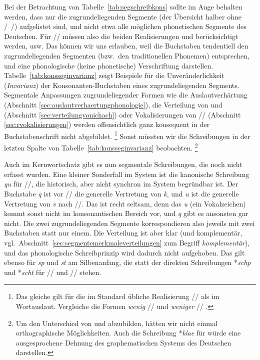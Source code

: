 Bei der Betrachtung von Tabelle~\ref{tab:segschreibkons} sollte im Auge behalten werden, dass nur die zugrundeliegenden Segmente (der Übersicht halber ohne /~/) aufgelistet sind, und nicht etwa alle möglichen phonetischen Segmente des Deutschen.
Für // müssen also die beiden Realisierungen \textipa{[\c{c}]} und \textipa{[X]} berücksichtigt werden, usw.
Das können wir uns erlauben, weil die Buchstaben tendentiell den zugrundeliegenden Segmenten (bzw.\ den traditionellen Phonemen) entsprechen, und eine phonologische (keine phonetische) Verschriftung darstellen.
Tabelle~\ref{tab:konsseginvarianz} zeigt Beispiele für die Unveränderlichkeit (\textit{Invarianz}) der Konsonanten-Buchstaben eines zugrundeliegenden Segments.
Segmentale Anpassungen zugrundeliegender Formen wie die Auslautverhärtung (Abschnitt \ref{sec:auslautverhaertungphonologie}), die Verteilung von \textipa{[\c{c}]} und \textipa{[X]} (Abschnitt \ref{sec:verteilungvonichach}) oder Vokalisierungen von // (Abschnitt \ref{sec:rvokalisierungen}) werden offensichtlich ganz konsequent in der Buchstabenschrift nicht abgebildet.%
\footnote{Das gleiche gilt für die im Standard übliche Realisierung // als \textipa{[I\c{c}]} im Wortauslaut.
Vergleiche die Formen \textit{wenig} // \textipa{[ve:nI\c{c}]} und \textit{weniger} // \textipa{[ve:nIg5]}.}
Sonst müssten wir die Schreibungen in der letzten Spalte von Tabelle~\ref{tab:konsseginvarianz} beobachten.%
\footnote{Um den Unterschied von \textipa{[\c{c}]} und \textipa{[X]} abzubilden, hätten wir nicht einmal orthographische Möglichkeiten.
Auch die Schreibung *\textit{klae} für \textipa{[kl\t{a@}]} würde eine ausgesprochene Dehnung des graphematischen Systems des Deutschen darstellen.}

Auch im Kernwortschatz gibt es nun segmentale Schreibungen, die noch nicht erfasst wurden.
Eine kleiner Sonderfall im System ist die kanonische Schreibung \textit{qu} für //, die historisch, aber nicht synchron im System begründbar ist.
Der Buchstabe \textit{q} ist vor // die generelle Vertretung von \textit{k}, und \textit{u} ist die generelle Vertretung von \textit{v} nach //.
Das ist recht seltsam, denn das \textit{u} (ein Vokalzeichen) kommt sonst nicht im konsonantischen Bereich vor, und \textit{q} gibt es ansonsten gar nicht.
Die zwei zugrundeliegenden Segmente korrespondieren also jeweils mit zwei Buchstaben statt nur einem.
Die Verteilung ist aber klar (und komplementär, vgl.\ Abschnitt~\ref{sec:segmentemerkmaleverteilungen} zum Begriff \textit{komplementär}), und das phonologische Schreibprinzip wird dadurch nicht aufgehoben.
Das gilt ebenso für \textit{sp} und \textit{st} am Silbenanfang, die statt der direkten Schreibungen *\textit{schp} und *\textit{scht} für // und // stehen.

